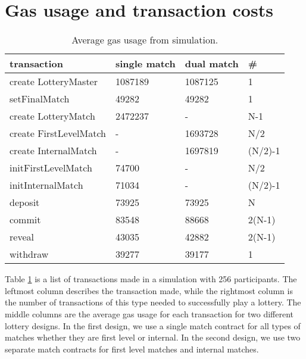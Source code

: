 \section{Gas usage and transaction costs}
\label{sec:gas}

\begin{table}[h]
\centering
\caption{Average gas usage from simulation.}
\label{tab:gas-usage}
\begin{tabular}{|l|l|l|l|}
\hline

transaction & single match & dual match & \# \\ \hline
create LotteryMaster & 1087189 & 1087125 & 1 \\ \hline
setFinalMatch & 49282 & 49282 & 1 \\ \hline
create LotteryMatch & 2472237 & - & N-1 \\ \hline
create FirstLevelMatch & - & 1693728 & N/2 \\ \hline
create InternalMatch & - & 1697819 & (N/2)-1 \\ \hline
initFirstLevelMatch & 74700 & - & N/2 \\ \hline
initInternalMatch & 71034 & - & (N/2)-1 \\ \hline
deposit & 73925 & 73925 & N \\ \hline
commit & 83548 & 88668 & 2(N-1) \\ \hline
reveal & 43035 & 42882 & 2(N-1) \\ \hline
withdraw & 39277 & 39177 & 1 \\ \hline

\end{tabular}
\end{table}

\noindent
Table \ref{tab:gas-usage} is a list of transactions made in a simulation with 256 participants. The leftmost column describes the transaction made, while the rightmost column is the number of transactions of this type needed to successfully play a lottery. The middle columns are the average gas usage for each transaction for two different lottery designs. In the first design, we use a single match contract for all types of matches whether they are first level or internal. In the second design, we use two separate match contracts for first level matches and internal matches. 

